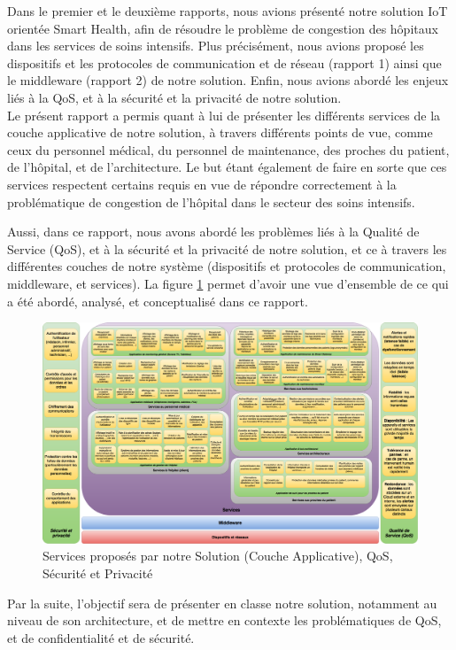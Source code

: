 Dans le premier et le deuxième rapports, nous avions présenté notre solution IoT orientée Smart Health, afin de résoudre le problème de congestion des hôpitaux dans les services de soins intensifs. Plus précisément, nous avions proposé les dispositifs et les protocoles de communication et de réseau (rapport 1) ainsi que le middleware (rapport 2) de notre solution. Enfin, nous avions abordé les enjeux liés à la QoS, et à la sécurité et la privacité de notre solution.
\\

Le présent rapport a permis quant à lui de présenter les différents services de la couche applicative de notre solution, à travers différents points de vue, comme ceux du personnel médical, du personnel de maintenance, des proches du patient, de l'hôpital, et de l'architecture. Le but étant également de faire en sorte que ces services respectent certains requis en vue de répondre correctement à la problématique de congestion de l'hôpital dans le secteur des soins intensifs. 

Aussi, dans ce rapport, nous avons abordé les problèmes liés à la Qualité de Service (QoS), et à la sécurité et la privacité de notre solution, et ce à travers les différentes couches de notre système (dispositifs et protocoles de communication, middleware, et services). La figure \ref{final} permet d'avoir une vue d'ensemble de ce qui a été abordé, analysé, et conceptualisé dans ce rapport.
\\
\begin{figure}[h!]
	\hspace*{-4.2cm}
	\centering
	\includegraphics[width=1.7\textwidth]{final.png}
	\caption{Services proposés par notre Solution (Couche Applicative), QoS, Sécurité et Privacité}
	\label{final}
\end{figure}

Par la suite, l'objectif sera de présenter en classe notre solution, notamment au niveau de son architecture, et de mettre en contexte les problématiques de QoS, et de confidentialité et de sécurité.